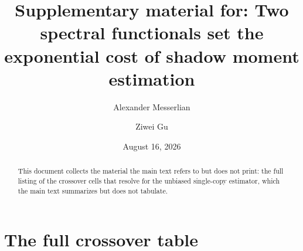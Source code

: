 \documentclass[a4paper,superscriptaddress,nofootinbib,onecolumn,nopdfoutputerror]{quantumarticle}
\begin{document}
\title{Supplementary material for: Two spectral functionals set the exponential cost of shadow moment estimation}

\author{Alexander Messerlian}
\author{Ziwei Gu}

\date{August 16, 2026}

\begin{abstract}
This document collects the material the main text refers to but does not
print: the full listing of the crossover cells that resolve for the unbiased
single-copy estimator, which the main text summarizes but does not tabulate.
\end{abstract}

\maketitle

\section{The full crossover table}\label{supp:cells}
\end{document}
